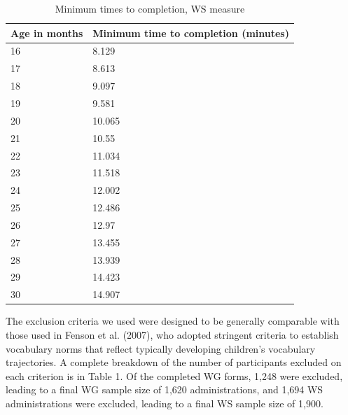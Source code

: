 \documentclass[
  english,
  ,man,floatsintext]{apa6}
\begin{document}
\begin{table}

\caption{\label{tab:unnamed-chunk-3}Minimum times to completion, WS measure}
\centering
\begin{tabular}[t]{l|l}
\hline
Age in months & Minimum time to completion (minutes)\\
\hline
16 & 8.129\\
\hline
17 & 8.613\\
\hline
18 & 9.097\\
\hline
19 & 9.581\\
\hline
20 & 10.065\\
\hline
21 & 10.55\\
\hline
22 & 11.034\\
\hline
23 & 11.518\\
\hline
24 & 12.002\\
\hline
25 & 12.486\\
\hline
26 & 12.97\\
\hline
27 & 13.455\\
\hline
28 & 13.939\\
\hline
29 & 14.423\\
\hline
30 & 14.907\\
\hline
\end{tabular}
\end{table}

The exclusion criteria we used were designed to be generally comparable with those used in Fenson et al. (2007), who adopted stringent criteria to establish vocabulary norms that reflect typically developing children's vocabulary trajectories. A complete breakdown of the number of participants excluded on each criterion is in Table 1. Of the completed WG forms, 1,248 were excluded, leading to a final WG sample size of 1,620 administrations, and 1,694 WS administrations were excluded, leading to a final WS sample size of 1,900.
\end{document}
